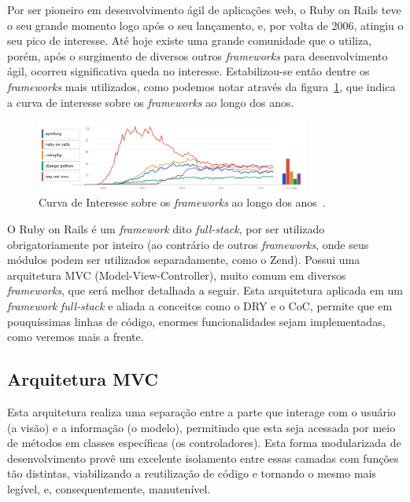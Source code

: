 Por ser pioneiro em desenvolvimento ágil de aplicações web, o Ruby on Rails teve o seu grande momento logo após o seu lançamento, e, por volta de 2006, atingiu o seu pico de interesse. Até hoje existe uma grande comunidade que o utiliza, porém, após o surgimento de diversos outros \textit{frameworks} para desenvolvimento ágil, ocorreu significativa queda no interesse. Estabilizou-se então dentre os \textit{frameworks} mais utilizados, como podemos notar através da figura~\ref{fig:curvainteresserails}, que indica a curva de interesse sobre os \textit{frameworks} ao longo dos anos.

\begin{figure}[H]
\centering
\includegraphics[width=0.8\textwidth]{figs/curva_de_interesse}
\caption[\textit{Curva de Interesse sobre os \textit{frameworks} ao longo dos anos}.]
{Curva de Interesse sobre os \textit{frameworks} ao longo dos anos~\cite{curvadeinteresseframeworks}.}
\label{fig:curvainteresserails}
\end{figure}

O Ruby on Rails é um \textit{framework} dito \textit{full-stack}, por ser utilizado obrigatoriamente por inteiro (ao contrário de outros \textit{frameworks}, onde seus módulos podem ser utilizados separadamente, como o Zend). Possui uma arquitetura MVC (Model-View-Controller),
muito comum em diversos \textit{frameworks}, que será melhor detalhada a seguir. Esta arquitetura aplicada em um \textit{framework} \textit{full-stack} e aliada a conceitos como o DRY e o CoC, permite que em pouquíssimas linhas de código, enormes funcionalidades sejam implementadas, como veremos mais a frente.

\subsection{Arquitetura MVC}

Esta arquitetura realiza uma separação entre a parte que interage com o usuário (a visão) e a informação (o modelo), permitindo que esta seja acessada por meio de métodos em classes específicas (os controladores). Esta forma modularizada de desenvolvimento provê um excelente isolamento entre essas camadas com funções tão distintas, viabilizando a reutilização de código e tornando o mesmo mais legível, e, consequentemente, manutenível.

